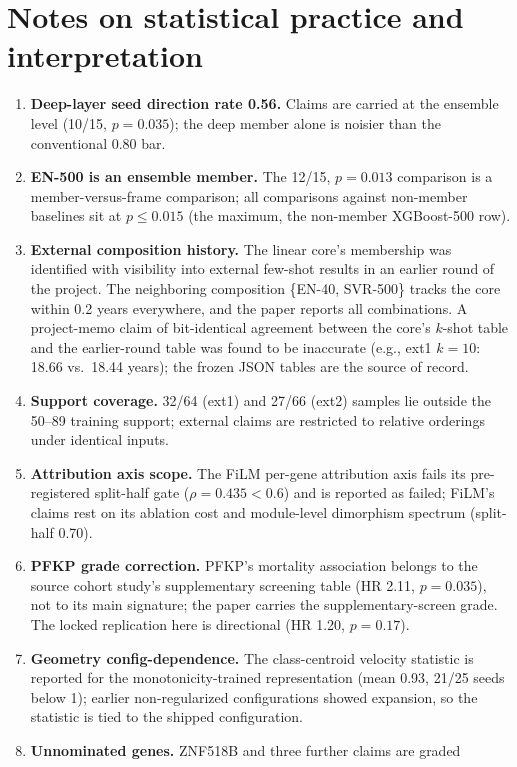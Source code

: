 \documentclass[11pt]{article}
\begin{document}
\section{Notes on statistical practice and interpretation}
\begin{enumerate}
\item \textbf{Deep-layer seed direction rate 0.56.} Claims are carried at the
ensemble level (10/15, $p=0.035$); the deep member alone is noisier than the
conventional 0.80 bar.
\item \textbf{EN-500 is an ensemble member.} The 12/15, $p=0.013$ comparison is a
member-versus-frame comparison; all comparisons against non-member baselines sit
at $p\le 0.015$ (the maximum, the non-member XGBoost-500 row).
\item \textbf{External composition history.} The linear core's membership was
identified with visibility into external few-shot results in an earlier round of
the project. The neighboring composition \{EN-40, SVR-500\} tracks the core
within 0.2 years everywhere, and the paper reports all combinations. A
project-memo claim of bit-identical agreement between the core's $k$-shot table
and the earlier-round table was found to be inaccurate (e.g., ext1 $k=10$:
18.66 vs.\ 18.44 years); the frozen JSON tables are the source of record.
\item \textbf{Support coverage.} 32/64 (ext1) and 27/66 (ext2) samples lie
outside the 50--89 training support; external claims are restricted to relative
orderings under identical inputs.
\item \textbf{Attribution axis scope.} The FiLM per-gene attribution axis fails
its pre-registered split-half gate ($\rho=0.435 < 0.6$) and is reported as
failed; FiLM's claims rest on its ablation cost and module-level dimorphism
spectrum (split-half 0.70).
\item \textbf{PFKP grade correction.} PFKP's mortality association belongs to the
source cohort study's supplementary screening table (HR 2.11, $p=0.035$), not to
its main signature; the paper carries the supplementary-screen grade. The locked
replication here is directional (HR 1.20, $p=0.17$).
\item \textbf{Geometry config-dependence.} The class-centroid velocity statistic
is reported for the monotonicity-trained representation (mean 0.93, 21/25 seeds
below 1); earlier non-regularized configurations showed expansion, so the
statistic is tied to the shipped configuration.
\item \textbf{Unnominated genes.} ZNF518B and three further claims are graded

\end{enumerate}
\end{document}
